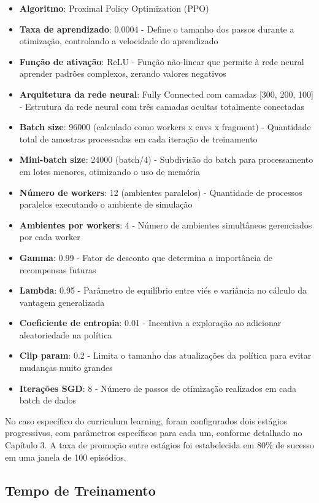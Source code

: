 \begin{itemize}
    \item \textbf{Algoritmo}: Proximal Policy Optimization (PPO) 
    \item \textbf{Taxa de aprendizado}: 0.0004 - Define o tamanho dos passos durante a otimização, controlando a velocidade do aprendizado
    \item \textbf{Função de ativação}: ReLU - Função não-linear que permite à rede neural aprender padrões complexos, zerando valores negativos
    \item \textbf{Arquitetura da rede neural}: Fully Connected com camadas [300, 200, 100] - Estrutura da rede neural com três camadas ocultas totalmente conectadas
    \item \textbf{Batch size}: 96000 (calculado como workers x envs x fragment) - Quantidade total de amostras processadas em cada iteração de treinamento
    \item \textbf{Mini-batch size}: 24000 (batch/4) - Subdivisão do batch para processamento em lotes menores, otimizando o uso de memória
    \item \textbf{Número de workers}: 12 (ambientes paralelos) - Quantidade de processos paralelos executando o ambiente de simulação
    \item \textbf{Ambientes por workers}: 4 - Número de ambientes simultâneos gerenciados por cada worker
    \item \textbf{Gamma}: 0.99 - Fator de desconto que determina a importância de recompensas futuras
    \item \textbf{Lambda}: 0.95 - Parâmetro de equilíbrio entre viés e variância no cálculo da vantagem generalizada
    \item \textbf{Coeficiente de entropia}: 0.01 - Incentiva a exploração ao adicionar aleatoriedade na política
    \item \textbf{Clip param}: 0.2 - Limita o tamanho das atualizações da política para evitar mudanças muito grandes
    \item \textbf{Iterações SGD}: 8 - Número de passos de otimização realizados em cada batch de dados
\end{itemize}

No caso específico do curriculum learning, foram configurados dois estágios progressivos, com parâmetros específicos para cada um, conforme detalhado no Capítulo 3. A taxa de promoção entre estágios foi estabelecida em 80\% de sucesso em uma janela de 100 episódios.

\subsection{Tempo de Treinamento}


